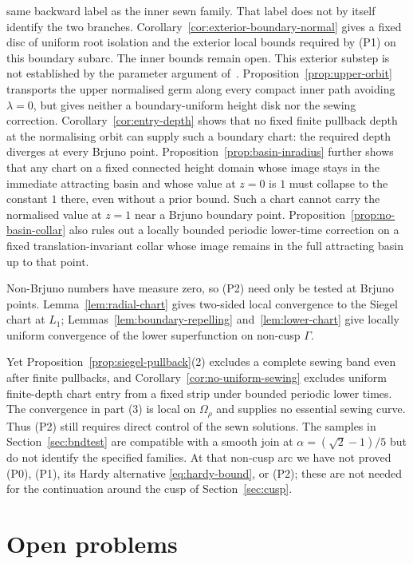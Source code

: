 \documentclass[11pt]{amsart}
\theoremstyle{definition}
\begin{document}
same backward label as the inner sewn family.  That label does not
by itself identify the two branches.
Corollary~\ref{cor:exterior-boundary-normal} gives a fixed disc of
uniform root isolation and the exterior local bounds required by
(P1) on this boundary subarc.  The inner bounds remain open.
This exterior substep is not established by the parameter argument
of~\cite[Prop.~3 and \S5]{Paulsen2019}.
Proposition~\ref{prop:upper-orbit} transports the upper normalised germ
along every compact inner path avoiding $\lambda=0$,
but gives neither a boundary-uniform height disk nor the sewing correction.
Corollary~\ref{cor:entry-depth} shows that no fixed finite pullback depth
at the normalising orbit can supply such a boundary chart: the required
depth diverges at every Brjuno point.
Proposition~\ref{prop:basin-inradius} further shows that any chart on a
fixed connected height domain whose image stays in the immediate
attracting basin and whose value at $z=0$ is $1$ must collapse to the
constant $1$ there, even without a prior bound.  Such a chart cannot
carry the normalised value at $z=1$ near a Brjuno boundary point.
Proposition~\ref{prop:no-basin-collar} also rules out a locally bounded
periodic lower-time correction on a fixed translation-invariant
collar whose image remains in the full attracting basin up to that point.

Non-Brjuno numbers have measure zero, so (P2) need only be tested at
Brjuno points.  Lemma~\ref{lem:radial-chart} gives two-sided local
convergence to the Siegel chart at $L_1$; Lemmas~\ref{lem:boundary-repelling}
and~\ref{lem:lower-chart} give locally uniform convergence of the lower
superfunction on non-cusp $\Gamma$.

Yet
Proposition~\ref{prop:siegel-pullback}(2) excludes a complete sewing band
even after finite pullbacks, and Corollary~\ref{cor:no-uniform-sewing}
excludes uniform finite-depth chart entry from a fixed strip under
bounded periodic lower times.  The convergence in part (3) is local on
$\Omega_\rho$ and supplies no essential sewing curve.  Thus (P2) still
requires direct control of the sewn solutions.  The samples in
Section~\ref{sec:bndtest} are compatible with
a smooth join at $\alpha=(\sqrt2-1)/5$ but do not identify the specified
families.  At that non-cusp arc we have not proved (P0), (P1), its Hardy
alternative \eqref{eq:hardy-bound}, or (P2); these are not needed for the
continuation around the cusp of Section~\ref{sec:cusp}.

\section{Open problems}\label{sec:open}
\end{document}
